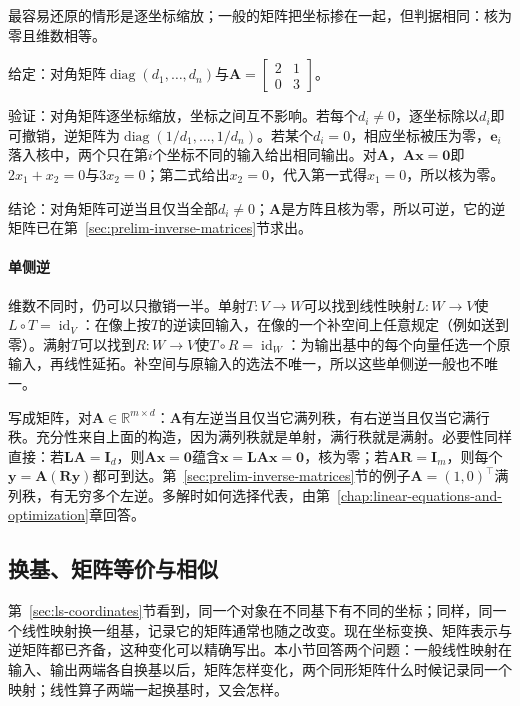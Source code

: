 最容易还原的情形是逐坐标缩放；一般的矩阵把坐标掺在一起，但判据相同：核为零且维数相等。
\begin{example}[用核判断可逆]
\label{ex:ls-kernel-invertibility}
给定：对角矩阵$\operatorname{diag}(d_1,\ldots,d_n)$与$\bm A=\left[\begin{smallmatrix}2&1\\0&3\end{smallmatrix}\right]$。

验证：对角矩阵逐坐标缩放，坐标之间互不影响。若每个$d_i\neq0$，逐坐标除以$d_i$即可撤销，逆矩阵为$\operatorname{diag}(1/d_1,\ldots,1/d_n)$。若某个$d_i=0$，相应坐标被压为零，$\bm e_i$落入核中，两个只在第$i$个坐标不同的输入给出相同输出。对$\bm A$，$\bm A\bm x=\bm0$即$2x_1+x_2=0$与$3x_2=0$；第二式给出$x_2=0$，代入第一式得$x_1=0$，所以核为零。

结论：对角矩阵可逆当且仅当全部$d_i\neq0$；$\bm A$是方阵且核为零，所以可逆，它的逆矩阵已在第~\ref{sec:prelim-inverse-matrices}节求出。
\end{example}

\paragraph{单侧逆}
维数不同时，仍可以只撤销一半。单射$T:V\to W$可以找到线性映射$L:W\to V$使$L\circ T=\operatorname{id}_V$：在像上按$T$的逆读回输入，在像的一个补空间上任意规定（例如送到零）。满射$T$可以找到$R:W\to V$使$T\circ R=\operatorname{id}_W$：为输出基中的每个向量任选一个原输入，再线性延拓。补空间与原输入的选法不唯一，所以这些单侧逆一般也不唯一。

写成矩阵，对$\bm A\in\mathbb R^{m\times d}$：$\bm A$有左逆当且仅当它满列秩，有右逆当且仅当它满行秩。充分性来自上面的构造，因为满列秩就是单射，满行秩就是满射。必要性同样直接：若$\bm L\bm A=\bm I_d$，则$\bm A\bm x=\bm0$蕴含$\bm x=\bm L\bm A\bm x=\bm0$，核为零；若$\bm A\bm R=\bm I_m$，则每个$\bm y=\bm A(\bm R\bm y)$都可到达。第~\ref{sec:prelim-inverse-matrices}节的例子$\bm A=(1,0)^\top$满列秩，有无穷多个左逆。多解时如何选择代表，由第~\ref{chap:linear-equations-and-optimization}章回答。

\subsection{换基、矩阵等价与相似}
\label{sec:ls-coordinates-change-of-basis}

第~\ref{sec:ls-coordinates}节看到，同一个对象在不同基下有不同的坐标；同样，同一个线性映射换一组基，记录它的矩阵通常也随之改变。现在坐标变换、矩阵表示与逆矩阵都已齐备，这种变化可以精确写出。本小节回答两个问题：一般线性映射在输入、输出两端各自换基以后，矩阵怎样变化，两个同形矩阵什么时候记录同一个映射；线性算子两端一起换基时，又会怎样。

